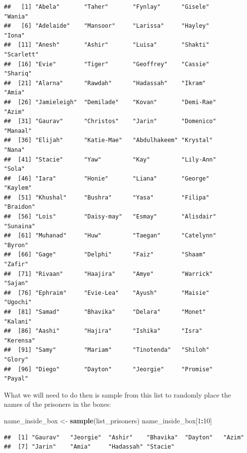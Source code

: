\documentclass[]{book}
\newenvironment{Shaded}{\begin{snugshade}}{\end{snugshade}}
\newcommand{\DecValTok}[1]{\textcolor[rgb]{0.00,0.00,0.81}{#1}}
\newcommand{\KeywordTok}[1]{\textcolor[rgb]{0.13,0.29,0.53}{\textbf{#1}}}
\newcommand{\NormalTok}[1]{#1}
\newcommand{\OperatorTok}[1]{\textcolor[rgb]{0.81,0.36,0.00}{\textbf{#1}}}
\newcommand{\StringTok}[1]{\textcolor[rgb]{0.31,0.60,0.02}{#1}}
\begin{document}
\begin{verbatim}
##   [1] "Abela"       "Taher"       "Fynlay"      "Gisele"      "Wania"      
##   [6] "Adelaide"    "Mansoor"     "Larissa"     "Hayley"      "Iona"       
##  [11] "Anesh"       "Ashir"       "Luisa"       "Shakti"      "Scarlett"   
##  [16] "Evie"        "Tiger"       "Geoffrey"    "Cassie"      "Shariq"     
##  [21] "Alarna"      "Rawdah"      "Hadassah"    "Ikram"       "Amia"       
##  [26] "Jamieleigh"  "Demilade"    "Kovan"       "Demi-Rae"    "Azim"       
##  [31] "Gaurav"      "Christos"    "Jarin"       "Domenico"    "Manaal"     
##  [36] "Elijah"      "Katie-Mae"   "Abdulhakeem" "Krystal"     "Nana"       
##  [41] "Stacie"      "Yaw"         "Kay"         "Lily-Ann"    "Sola"       
##  [46] "Iara"        "Honie"       "Liana"       "George"      "Kaylem"     
##  [51] "Khushal"     "Bushra"      "Yasa"        "Filipa"      "Braidon"    
##  [56] "Lois"        "Daisy-may"   "Esmay"       "Alisdair"    "Sunaina"    
##  [61] "Muhanad"     "Huw"         "Taegan"      "Catelynn"    "Byron"      
##  [66] "Gage"        "Delphi"      "Faiz"        "Shaam"       "Zafir"      
##  [71] "Rivaan"      "Haajira"     "Amye"        "Warrick"     "Sajan"      
##  [76] "Ephraim"     "Evie-Lea"    "Ayush"       "Maisie"      "Ugochi"     
##  [81] "Samad"       "Bhavika"     "Delara"      "Monet"       "Kalani"     
##  [86] "Aashi"       "Hajira"      "Ishika"      "Isra"        "Kerensa"    
##  [91] "Samy"        "Mariam"      "Tinotenda"   "Shiloh"      "Glory"      
##  [96] "Diego"       "Dayton"      "Jeorgie"     "Promise"     "Payal"
\end{verbatim}

What we will need to do then is sample from this list to randomly place the names of the prisoners in the boxes:

\begin{Shaded}
\begin{Highlighting}[]
\NormalTok{name_inside_box <-}\StringTok{ }\KeywordTok{sample}\NormalTok{(list_prisoners)}
\NormalTok{name_inside_box[}\DecValTok{1}\OperatorTok{:}\DecValTok{10}\NormalTok{]}
\end{Highlighting}
\end{Shaded}

\begin{verbatim}
##  [1] "Gaurav"   "Jeorgie"  "Ashir"    "Bhavika"  "Dayton"   "Azim"    
##  [7] "Jarin"    "Amia"     "Hadassah" "Stacie"
\end{verbatim}
\end{document}
